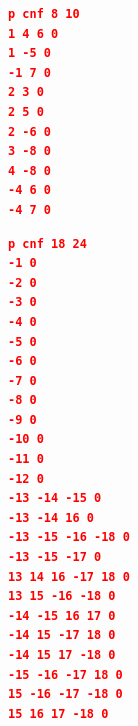 \documentclass[a4paper, 12pt, bibliography=totoc]{scrartcl}
\begin{document}
\begin{lstlisting}[caption={CNF clauses from example 4.1 in \cite{DiplomarbeitZisser} page 27}, label={lst:clausesDA41},language=json,xleftmargin=5.5cm,xrightmargin=5.8cm]
p cnf 8 10
1 4 6 0
1 -5 0
-1 7 0
2 3 0
2 5 0
2 -6 0
3 -8 0
4 -8 0
-4 6 0
-4 7 0
\end{lstlisting}
\begin{lstlisting}[caption={CNF clauses from random example with 12 units},label={lst:example18-24},language=json,xleftmargin=5.5cm,xrightmargin=5.8cm]
p cnf 18 24
-1 0
-2 0
-3 0
-4 0
-5 0
-6 0
-7 0
-8 0
-9 0
-10 0
-11 0
-12 0
-13 -14 -15 0
-13 -14 16 0
-13 -15 -16 -18 0
-13 -15 -17 0
13 14 16 -17 18 0
13 15 -16 -18 0
-14 -15 16 17 0
-14 15 -17 18 0
-14 15 17 -18 0
-15 -16 -17 18 0
15 -16 -17 -18 0
15 16 17 -18 0
\end{lstlisting}

\pagebreak


\newpage
\listoffigures
\newpage
\listoftables
\renewcommand{\lstlistlistingname}{Listings}
\lstlistoflistings
\newpage
\printbibliography
%
\end{document}
